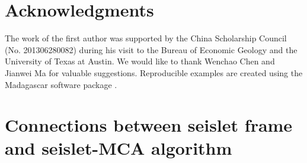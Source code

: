 \section*{Acknowledgments}

The work of the first author was supported by the China Scholarship Council (No. 201306280082) during his visit to the Bureau of Economic Geology and the University of Texas at Austin. We would like to thank Wenchao Chen and Jianwei Ma for valuable suggestions. Reproducible examples are created using the  Madagascar software package \citep{m8r}.

\appendix
\section{Connections between seislet frame and seislet-MCA algorithm}
\label{app:seisletframe}

